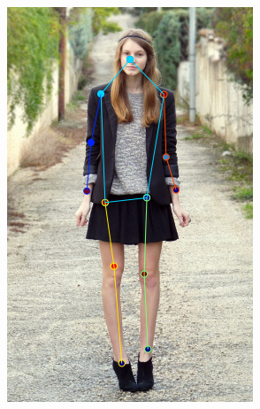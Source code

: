 \begin{figure}[t!]
\begin{subfigure}[b]{0.115\textwidth}
    \end{subfigure}
    \hfill
    \begin{subfigure}[b]{0.115\textwidth}
            \includegraphics[width=\textwidth]{resources/MotivativeAnnotation/FashionPose/bad_anno-2}
    \end{subfigure}
  	\hfill
    \begin{subfigure}[b]{0.115\textwidth}

\end{subfigure}
\end{figure}
